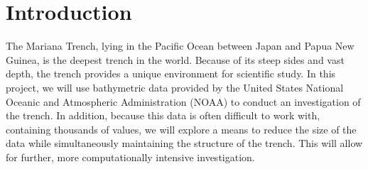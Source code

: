 \section{Introduction} \label{sec:intro}
The Mariana Trench, lying in the Pacific Ocean between Japan and Papua New Guinea, is the deepest trench in the world. Because of its steep sides and vast depth, the trench provides a unique environment for scientific study. In this project, we will use bathymetric data provided by the United States National Oceanic and Atmospheric Administration (NOAA) to conduct an investigation of the trench. In addition, because this data is often difficult to work with, containing thousands of values, we will explore a means to reduce the size of the data while simultaneously maintaining the structure of the trench. This will allow for further, more computationally intensive investigation.

